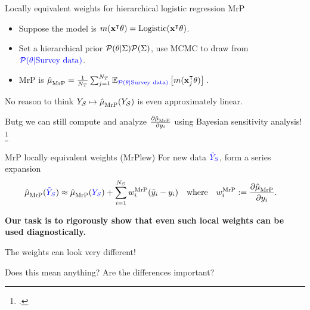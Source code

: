 \begin{frame}[t]{Locally equivalent weights for hierarchical logistic regression MrP}

\def\Y{\surcol{Y_S}}
\def\Ytil{\surcol{\tilde{Y}_S}}
%
\begin{itemize}
    \item Suppose the model is $m(\mathbf{x}^\intercal \theta) = \mathrm{Logistic}(\mathbf{x}^\intercal \theta)$.
    \item Set a hierarchical prior $\mathcal{P}(\theta \vert \Sigma)\mathcal{P}(\Sigma)$,
            use MCMC to draw from $\textcolor{blue}{\mathcal{P}(\theta \vert \textrm{Survey data})}$.
    \item MrP is $\hat{\mu}^{}_{\mathrm{MrP}} = \frac{1}{{N_T}} \sum_{j=1}^{N_T} \mathbb{E}_{\textcolor{blue}{\mathcal{P}(\theta \vert \textrm{Survey data})}}\left[ m(\mathbf{x}_j^\intercal \theta)\right]\,$.
\end{itemize}
%
No reason to think $Y_{\mathcal{S}} \mapsto \hat{\mu}^{}_{\mathrm{MrP}}(Y_{\mathcal{S}})$ is even approximately linear.

Butg we can still compute and analyze $\frac{\partial \hat{\mu}^{}_{\mathrm{MrP}}}{\partial y_i}$
using Bayesian sensitivity analysis!
\footcite{gustafson:1996:localposterior,giordano:2018:covariances}

\pause
\begin{block}{MrP locally equivalent weights (MrPlew)}
\centering
\vspace{1em}
For new data $\Ytil$, form a series expansion
$$
\begin{aligned}
\muhat_\mrp(\Ytil) \approx{}& \muhat_\mrp(\Y) + \sumsur \w_i^\mrp (\ytil_i - \y_i)\quad
\textrm{where}\quad \w_i^\mrp :={} \frac{\partial \muhat_\mrp}{\partial \y_i}.
\end{aligned}
$$
\vspace{1em}
\end{block}
%
\pause
\textbf{
Our task is to rigorously show that even such local weights can be used
diagnostically.
}

%


\end{frame}




\begin{frame}{The weights can look very different!}

    \centering
    Does this mean anything?  Are the differences important?

    \WeightPlot{}
\end{frame}


